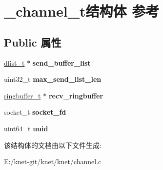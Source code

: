 \hypertarget{struct__channel__t}{}\section{\+\_\+channel\+\_\+t结构体 参考}
\label{struct__channel__t}
\subsection*{Public 属性}
\begin{DoxyCompactItemize}
\item 
\hypertarget{struct__channel__t_afb34664957775dd12ca46abfd8b640d2}{}\hyperlink{struct__dlist__t}{dlist\+\_\+t} $\ast$ {\bfseries send\+\_\+buffer\+\_\+list}\label{struct__channel__t_afb34664957775dd12ca46abfd8b640d2}

\item 
\hypertarget{struct__channel__t_a5508b5b3a6398c4ae99698a6f61284aa}{}uint32\+\_\+t {\bfseries max\+\_\+send\+\_\+list\+\_\+len}\label{struct__channel__t_a5508b5b3a6398c4ae99698a6f61284aa}

\item 
\hypertarget{struct__channel__t_aef08f14aa19b7df9255d93fced554200}{}\hyperlink{struct__ringbuffer__t}{ringbuffer\+\_\+t} $\ast$ {\bfseries recv\+\_\+ringbuffer}\label{struct__channel__t_aef08f14aa19b7df9255d93fced554200}

\item 
\hypertarget{struct__channel__t_a6bc972bd52fd95bada62bbd8afe65e1e}{}socket\+\_\+t {\bfseries socket\+\_\+fd}\label{struct__channel__t_a6bc972bd52fd95bada62bbd8afe65e1e}

\item 
\hypertarget{struct__channel__t_a9bacff19ff16310a0b60c5d8a55924b6}{}uint64\+\_\+t {\bfseries uuid}\label{struct__channel__t_a9bacff19ff16310a0b60c5d8a55924b6}

\end{DoxyCompactItemize}


该结构体的文档由以下文件生成\+:\begin{DoxyCompactItemize}
\item 
E\+:/knet-\/git/knet/knet/channel.\+c\end{DoxyCompactItemize}
